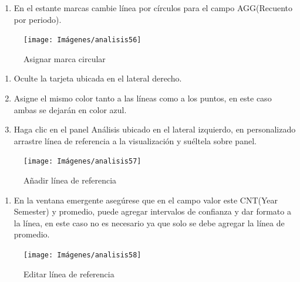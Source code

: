 \documentclass[
]{book}
\providecommand{\tightlist}{%
  \setlength{\itemsep}{0pt}\setlength{\parskip}{0pt}}
\begin{document}
\begin{enumerate}
\def\labelenumi{\arabic{enumi}.}
\setcounter{enumi}{4}
\tightlist
\item
  En el estante marcas cambie línea por círculos para el campo AGG(Recuento por periodo).
\end{enumerate}

\begin{figure}

{\centering \texttt{[image: Imágenes/analisis56]} 

}

\caption{Asignar marca circular}\label{fig:paso5graficodecontrol-fig}
\end{figure}

\begin{enumerate}
\def\labelenumi{\arabic{enumi}.}
\setcounter{enumi}{5}
\item
  Oculte la tarjeta ubicada en el lateral derecho.
\item
  Asigne el mismo color tanto a las líneas como a los puntos, en este caso ambas se dejarán en color azul.
\item
  Haga clic en el panel Análisis ubicado en el lateral izquierdo, en personalizado arrastre línea de referencia a la visualización y suéltela sobre panel.
\end{enumerate}

\begin{figure}

{\centering \texttt{[image: Imágenes/analisis57]} 

}

\caption{Añadir línea de referencia}\label{fig:paso8graficodecontrol-fig}
\end{figure}

\begin{enumerate}
\def\labelenumi{\arabic{enumi}.}
\setcounter{enumi}{8}
\tightlist
\item
  En la ventana emergente asegúrese que en el campo valor este CNT(Year Semester) y promedio, puede agregar intervalos de confianza y dar formato a la línea, en este caso no es necesario ya que solo se debe agregar la línea de promedio.
\end{enumerate}

\begin{figure}

{\centering \texttt{[image: Imágenes/analisis58]} 

}

\caption{Editar línea de referencia}\label{fig:paso9graficodecontrol-fig}
\end{figure}
\end{document}
